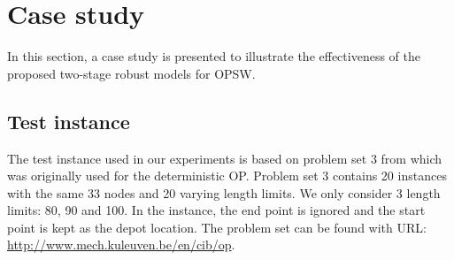 \documentclass[preprint,review,10pt,round,authoryear]{elsarticle}\usepackage[]{graphicx}\usepackage[]{color}
\theoremstyle{plain}
\newtheorem{prop}{Proposition}
\theoremstyle{definition}
\theoremstyle{remark}
\begin{document}
% 
% 


\section{Case study}
\label{section:cs}
In this section, a case study is presented to illustrate the effectiveness of the proposed two-stage robust models for OPSW. 

\subsection{Test instance}
The test instance used in our experiments is based on problem set 3 from \cite{tsiligirides1984heuristic} which was originally used for the deterministic OP. Problem set 3 contains 20 instances with the same 33 nodes and 20 varying length limits. We only consider 3 length limits: 80, 90 and 100. In the instance, the end point is ignored and the start point is kept as the depot location. The problem set can be found with URL: \url{http://www.mech.kuleuven.be/en/cib/op}. 
\end{document}

